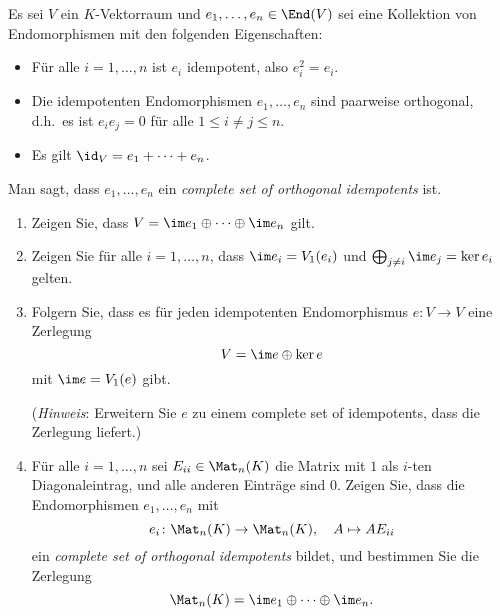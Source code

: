 \begin{question}
  Es sei $V$ ein $K$-Vektorraum und $e_1, \dotsc, e_n \in \End(V)$ sei eine Kollektion von Endomorphismen mit den folgenden Eigenschaften:
  \begin{itemize}
    \item
      Für alle $i = 1, \dotsc, n$ ist $e_i$ idempotent, also $e_i^2 = e_i$.
    \item
      Die idempotenten Endomorphismen $e_1, \dotsc, e_n$ sind paarweise orthogonal, d.h.\ es ist $e_i e_j = 0$ für alle $1 \leq i \neq j \leq n$.
    \item
      Es gilt $\id_V = e_1 + \dotsb + e_n$.
  \end{itemize}
  Man sagt, dass $e_1, \dotsc, e_n$ ein \emph{complete set of orthogonal idempotents} ist.
  \begin{enumerate}[leftmargin=*]
    \item
      Zeigen Sie, dass $V = \im e_1 \oplus \dotsb \oplus \im e_n$ gilt.
    \item
      Zeigen Sie für alle $i = 1, \dotsc, n$, dass $\im e_i = V_1(e_i)$ und $\bigoplus_{j \neq i} \im e_j = \ker e_i$ gelten.
    \item
      Folgern Sie, dass es für jeden idempotenten Endomorphismus $e \colon V \to V$ eine Zerlegung
      \[
        V = \im e \oplus \ker e
      \]
      mit $\im e = V_1(e)$ gibt.
      
      (\emph{Hinweis}:
       Erweitern Sie $e$ zu einem complete set of idempotents, dass die Zerlegung liefert.)
    \item
      Für alle $i = 1, \dotsc, n$ sei $E_{ii} \in \Mat_n(K)$ die Matrix mit $1$ als $i$-ten Diagonaleintrag, und alle anderen Einträge sind $0$.
      Zeigen Sie, dass die Endomorphismen $e_1, \dotsc, e_n$ mit
      \[
        e_i \colon \Mat_n(K) \to \Mat_n(K),
        \quad
        A \mapsto A E_{ii}
      \]
      ein \emph{complete set of orthogonal idempotents} bildet, und bestimmen Sie die Zerlegung
      \[
        \Mat_n(K) = \im e_1 \oplus \dotsb \oplus \im e_n.
      \]
  \end{enumerate}
\end{question}


